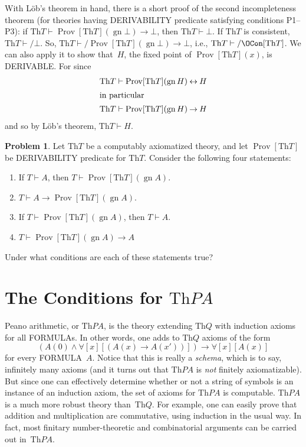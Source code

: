 \documentclass[10pt,a4paper]{article}
\newcommand*{\olup}[1]{\MakeUppercase{#1}}
\theoremstyle{plain}
\theoremstyle{definition}
\newtheorem{prob}{Problem}[section]
\theoremstyle{remark}
\newcommand*{\olfileid}[3]{}
\newcommand*{\olsection}[1]{\section*{#1}}
\providecommand{\lif}{\mathbin{\rightarrow}}
\providecommand{\lforall}{\mathord{\forall}}
\providecommand{\lfalse}{\bot}
\providecommand{\Proves}{\mathrel{\vdash}}
\providecommand{\Th}{\ensuremath{\mathrm{Th}}}
\providecommand{\gn}{\operatorname{gn}}
\providecommand{\liff}{\mathbin{\leftrightarrow}}
\providecommand{\OProv}{\operatorname{Prov}}
\begin{document}
With L\"ob's theorem in hand, there is a short proof of the second
incompleteness theorem (for theories having \olup{derivability} predicate
satisfying conditions P1--P3): if $\Th{T} \Proves
\OProv[\Th{T}](\gn{\lfalse}) \lif \lfalse$, then $\Th{T} \Proves \lfalse$.
If $\Th{T}$ is consistent, $\Th{T} \Proves/ \lfalse$. So, $\Th{T}
\Proves/ \OProv[\Th{T}](\gn{\lfalse}) \lif \lfalse$, i.e., $\Th{T} \Proves/
\OCon[\Th{T}]$.  We can also apply it to show that~$H$, the fixed
point of $\OProv[\Th{T}](x)$, is \olup{derivable}. For since
\begin{align*}
  \Th{T} & \Proves \OProv[\Th{T}](\gn{H}) \liff H\\
  \intertext{in particular}
    \Th{T} & \Proves \OProv[\Th{T}](\gn{H}) \lif H
\end{align*}
and so by L\"ob's theorem, $\Th{T} \Proves H$.


\begin{prob}
Let $\Th{T}$ be a computably axiomatized theory, and
let $\OProv[\Th{T}]$ be \olup{derivability} predicate for $\Th{T}$. Consider the
following four statements:
\begin{enumerate}
\item If $T \Proves A$, then $T \Proves \OProv[\Th{T}](\gn{A})$.
\item $T \Proves A \lif \OProv[\Th{T}](\gn{A})$.
\item If $T \Proves \OProv[\Th{T}](\gn{A})$, then $T \Proves A$.
\item $T \Proves \OProv[\Th{T}](\gn{A}) \lif A$
\end{enumerate}
Under what conditions are each of these statements true?
\end{prob}





\olfileid{inc}{inp}{prc}

\olsection{The  Conditions for $\Th{PA}$}

Peano arithmetic, or $\Th{PA}$, is the theory extending $\Th{Q}$ with
induction axioms for all \olup{formula}s. In other words, one adds to $\Th{Q}$
axioms of the form
\[
(A(0) \land \lforall[x][(A(x) \lif A(x'))]) \lif \lforall[x][A(x)]
\]
for every \olup{formula}~$A$. Notice that this is really a
\emph{schema}, which is to say, infinitely many axioms (and it turns
out that $\Th{PA}$ is {\em not} finitely axiomatizable). But since one
can effectively determine whether or not a string of symbols is an
instance of an induction axiom, the set of axioms for $\Th{PA}$ is
computable. $\Th{PA}$ is a much more robust theory than~$\Th{Q}$. For
example, one can easily prove that addition and multiplication are
commutative, using induction in the usual way. In fact, most finitary
number-theoretic and combinatorial arguments can be carried out
in~$\Th{PA}$.
\end{document}
